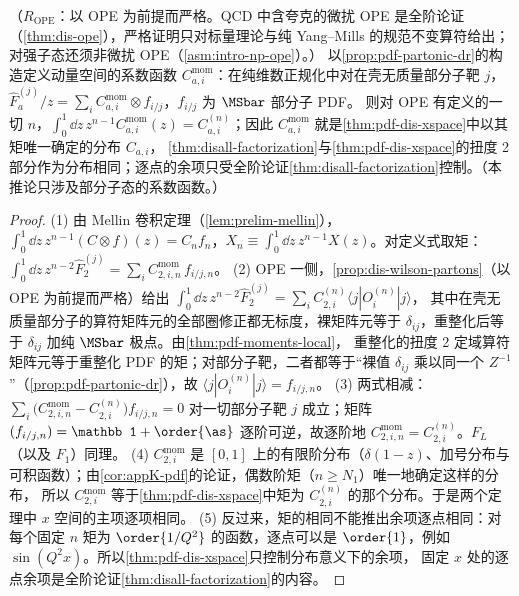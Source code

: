 \begin{corollary}\label{cor:disall-consistency}
（$R_{\mathrm{OPE}}$：以 OPE 为前提而严格。QCD 中含夸克的微扰 OPE 是全阶论证（\cref{thm:dis-ope}），严格证明只对标量理论与纯 Yang--Mills 的规范不变算符给出；对强子态还须非微扰 OPE（\cref{asm:intro-np-ope}）。）
以\cref{prop:pdf-partonic-dr}的构造定义动量空间的系数函数 $C^{\mathrm{mom}}_{a,i}$：在纯维数正规化中对在壳无质量部分子靶 $j$，$\hat F^{(j)}_a/z=\sum_iC^{\mathrm{mom}}_{a,i}\otimes f_{i/j}$，$f_{i/j}$ 为 $\MSbar$ 部分子 PDF。
则对 OPE 有定义的一切 $n$，$\int_0^1\dd z\,z^{n-1}C^{\mathrm{mom}}_{a,i}(z)=C^{(n)}_{a,i}$；因此 $C^{\mathrm{mom}}_{a,i}$ 就是\cref{thm:pdf-dis-xspace}中以其矩唯一确定的分布 $C_{a,i}$，
\cref{thm:disall-factorization}与\cref{thm:pdf-dis-xspace}的扭度 2 部分作为分布相同；逐点的余项只受全阶论证\cref{thm:disall-factorization}控制。（本推论只涉及部分子态的系数函数。）
\end{corollary}

\begin{proof}
(1) 由 Mellin 卷积定理（\cref{lem:prelim-mellin}），$\int_0^1\dd z\,z^{n-1}(C\otimes f)(z)=C_nf_n$，$X_n\equiv\int_0^1\dd z\,z^{n-1}X(z)$。对定义式取矩：
$\int_0^1\dd z\,z^{n-2}\hat F^{(j)}_2=\sum_iC^{\mathrm{mom}}_{2,i,n}\,f_{i/j,n}$。
(2) OPE 一侧，\cref{prop:dis-wilson-partons}（以 OPE 为前提而严格）给出 $\int_0^1\dd z\,z^{n-2}\hat F^{(j)}_2=\sum_iC^{(n)}_{2,i}\langle j|O^{(n)}_i|j\rangle$，
其中在壳无质量部分子的算符矩阵元的全部圈修正都无标度，裸矩阵元等于 $\delta_{ij}$，重整化后等于 $\delta_{ij}$ 加纯 $\MSbar$ 极点。由\cref{thm:pdf-moments-local}，
重整化的扭度 2 定域算符矩阵元等于重整化 PDF 的矩；对部分子靶，二者都等于“裸值 $\delta_{ij}$ 乘以同一个 $Z^{-1}$”（\cref{prop:pdf-partonic-dr}），故 $\langle j|O^{(n)}_i|j\rangle=f_{i/j,n}$。
(3) 两式相减：$\sum_i\big(C^{\mathrm{mom}}_{2,i,n}-C^{(n)}_{2,i}\big)f_{i/j,n}=0$ 对一切部分子靶 $j$ 成立；矩阵 $(f_{i/j,n})=\mathbb 1+\order{\as}$ 逐阶可逆，故逐阶地 $C^{\mathrm{mom}}_{2,i,n}=C^{(n)}_{2,i}$。$F_L$（以及 $F_1$）同理。
(4) $C^{\mathrm{mom}}_{2,i}$ 是 $[0,1]$ 上的有限阶分布（$\delta(1-z)$、加号分布与可积函数）；由\cref{cor:appK-pdf}的论证，偶数阶矩（$n\ge N_1$）唯一地确定这样的分布，
所以 $C^{\mathrm{mom}}_{2,i}$ 等于\cref{thm:pdf-dis-xspace}中矩为 $C^{(n)}_{2,i}$ 的那个分布。于是两个定理中 $x$ 空间的主项逐项相同。
(5) 反过来，矩的相同不能推出余项逐点相同：对每个固定 $n$ 矩为 $\order{1/Q^2}$ 的函数，逐点可以是 $\order{1}$，例如 $\sin(Q^2x)$。所以\cref{thm:pdf-dis-xspace}只控制分布意义下的余项，
固定 $x$ 处的逐点余项是全阶论证\cref{thm:disall-factorization}的内容。
\end{proof}

